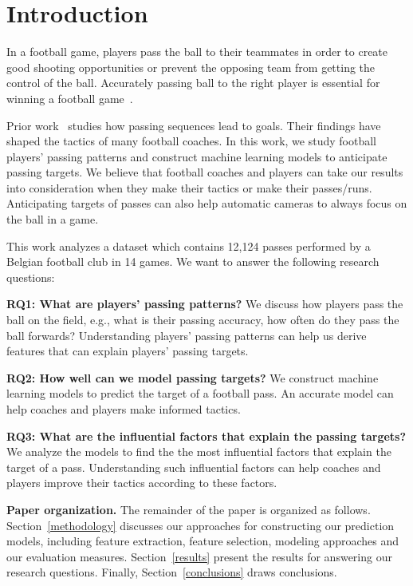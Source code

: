 \section{Introduction} \label{intro}
In a football game, players pass the ball to their teammates in order to create good shooting opportunities or prevent the opposing team from getting the control of the ball.
Accurately passing ball to the right player is essential for winning a football game~\cite{Ali2011Measuring,Hughes2005Analysis}.

Prior work~\cite{reep1968skill,Hughes2005Analysis} studies how passing sequences lead to goals. Their findings have shaped the tactics of many football coaches.
In this work, we study football players' passing patterns and construct machine learning models to anticipate passing targets.
We believe that football coaches and players can take our results into consideration when they make their tactics or make their passes/runs. 
Anticipating targets of passes can also help automatic cameras to always focus on the ball in a game.

This work analyzes a dataset which contains 12,124 passes performed by a Belgian football club in 14 games. We want to answer the following research questions: 

\begin{description}
	\item \textbf{RQ1: What are players' passing patterns?}
	We discuss how players pass the ball on the field, e.g., what is their passing accuracy, how often do they pass the ball forwards?
	Understanding players' passing patterns can help us derive features that can explain players' passing targets. 
	
	\item \textbf{RQ2: How well can we model passing targets?}
	We construct machine learning models to predict the target of a football pass. 
	An accurate model can help coaches and players make informed tactics.
	
	\item \textbf{RQ3: What are the influential factors that explain the passing targets?}
	We analyze the models to find the the most influential factors that explain the target of a pass. Understanding such influential factors can help coaches and players improve their tactics according to these factors.
\end{description}

\textbf{Paper organization.}
The remainder of the paper is organized as follows.
Section~\ref{methodology} discusses our approaches for constructing our prediction models, including feature extraction, feature selection, modeling approaches and our evaluation measures.
Section~\ref{results} present the results for answering our research questions.
Finally, Section~\ref{conclusions} draws conclusions.

